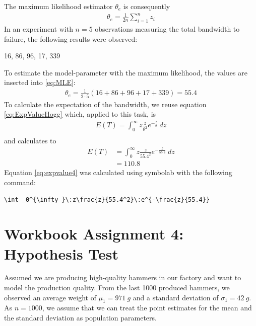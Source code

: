 The maximum likelihood estimator $\theta_e$ is consequently 
\begin{equation}
\begin{split}
\theta_e =\frac{1}{2n}\sum_{i=1}^n z_i
\end{split}
\label{eq:MLE}
\end{equation}
In an experiment with $n=5$ observations measuring the total bandwidth to failure, the following results were observed:
\begin{center}
16, 86, 96, 17, 339
\end{center}
To estimate the model-parameter with the maximum likelihood, the values are inserted into \eqref{eq:MLE}:
\begin{equation}
\begin{split}
\theta_e =\frac{1}{2\cdot5}(16+86+96+17+339) = 55.4
\end{split}
\label{eq:MLECalculation}
\end{equation}
To calculate the expectation of the bandwidth, we reuse equation \eqref{eq:ExpValueHogg} which, applied to this task, is
\begin{equation}
\begin{split}
E(T) = \int_0^\infty z\frac{z}{\theta^2} e^{-\frac{z}{\theta}}~dz\\
\end{split}
\label{eq:expvalue3}
\end{equation}
and calculates to 
\begin{equation}
\begin{split}
E(T) 
&= \int_0^\infty z\frac{z}{55.4^2} e^{-\frac{z}{55.4}}~dz\\
&= 110.8
\end{split}
\label{eq:expvalue4}
\end{equation}
Equation \eqref{eq:expvalue4} was calculated using symbolab \cite{symbolab} with the following command:
\begin{lstlisting}
\int _0^{\infty }\:z\frac{z}{55.4^2}\:e^{-\frac{z}{55.4}}
\end{lstlisting}

\chapter{Workbook Assignment 4: Hypothesis Test}	

Assumed we are producing high-quality hammers in our factory and want to model the production quality. From the last 1000 produced hammers, we observed an average weight of $\mu_1=971~g$ and a standard deviation of $\sigma_1 = 42~g$. As $n = 1000$, we assume that we can treat the point estimates for the mean and the standard deviation as population parameters.

